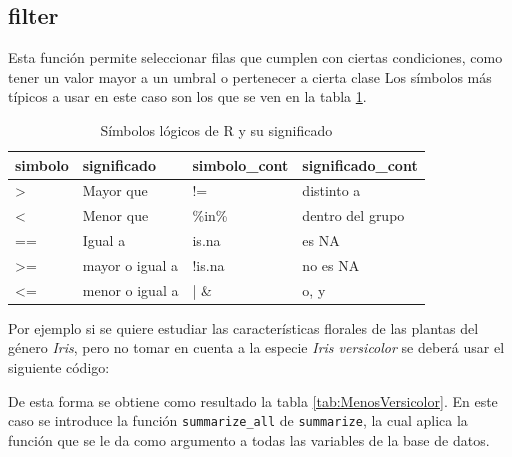 \documentclass[]{book}
\newenvironment{Shaded}{\begin{snugshade}}{\end{snugshade}}
\newcommand{\KeywordTok}[1]{\textcolor[rgb]{0.13,0.29,0.53}{\textbf{#1}}}
\newcommand{\NormalTok}[1]{#1}
\newcommand{\OperatorTok}[1]{\textcolor[rgb]{0.81,0.36,0.00}{\textbf{#1}}}
\newcommand{\StringTok}[1]{\textcolor[rgb]{0.31,0.60,0.02}{#1}}
\begin{document}
\hypertarget{filter}{%
\subsection{filter}\label{filter}}

Esta función permite seleccionar filas que cumplen con ciertas
condiciones, como tener un valor mayor a un umbral o pertenecer a cierta
clase Los símbolos más típicos a usar en este caso son los que se ven en
la tabla \ref{tab:Logicas}.

\begin{table}

\caption{\label{tab:Logicas}Símbolos lógicos de R y su significado}
\centering
\begin{tabular}[t]{llll}
\toprule
simbolo & significado & simbolo\_cont & significado\_cont\\
\midrule
> & Mayor que & != & distinto a\\
< & Menor que & \%in\% & dentro del grupo\\
== & Igual a & is.na & es NA\\
>= & mayor o igual a & !is.na & no es NA\\
<= & menor o igual a & | \& & o, y\\
\bottomrule
\end{tabular}
\end{table}

Por ejemplo si se quiere estudiar las características florales de las
plantas del género \emph{Iris}, pero no tomar en cuenta a la especie
\emph{Iris versicolor} se deberá usar el siguiente código:

\begin{Shaded}
\end{Shaded}

De esta forma se obtiene como resultado la tabla
\ref{tab:MenosVersicolor}. En este caso se introduce la función
\texttt{summarize\_all} de \texttt{summarize}, la cual aplica la función
que se le da como argumento a todas las variables de la base de datos.
\end{document}

